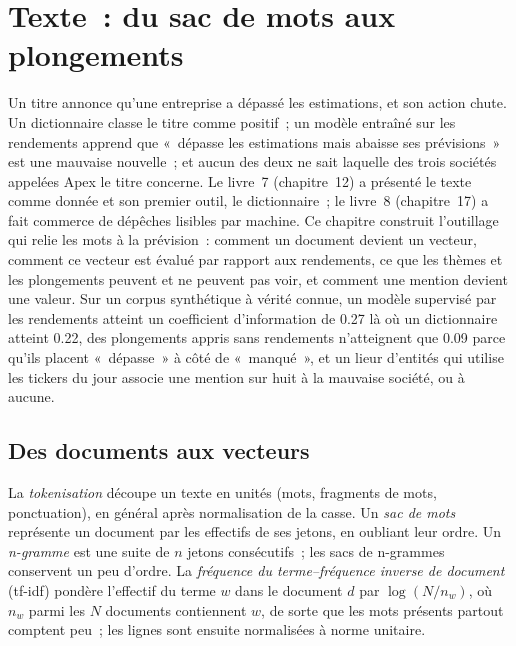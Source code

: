 \chapter{Texte~: du sac de mots aux plongements}\label{ch:ml:text-from-bag-of-words-to-embeddings}

Un titre annonce qu'une entreprise a dépassé les estimations, et son action chute. Un dictionnaire classe le titre comme positif~; un modèle
entraîné sur les rendements apprend que «~dépasse les estimations mais abaisse ses prévisions~» est une mauvaise nouvelle~; et aucun des deux ne sait laquelle des trois sociétés
appelées Apex le titre concerne. Le livre~7 (chapitre~12) a présenté le texte comme donnée et son premier outil, le dictionnaire~;
le livre~8 (chapitre~17) a fait commerce de dépêches lisibles par machine. Ce chapitre construit l'outillage qui relie les mots à la prévision~:
comment un document devient un vecteur, comment ce vecteur est évalué par rapport aux rendements, ce que les thèmes et les plongements peuvent et ne peuvent pas
voir, et comment une mention devient une valeur. Sur un corpus synthétique à vérité connue, un modèle supervisé par les rendements atteint
un coefficient d'information de 0.27 là où un dictionnaire atteint 0.22, des plongements appris sans rendements n'atteignent que 0.09 parce
qu'ils placent «~dépasse~» à côté de «~manqué~», et un lieur d'entités qui utilise les tickers du jour associe une mention sur huit à la
mauvaise société, ou à aucune.

\section{Des documents aux vecteurs}

\begin{definition}\label{def:ml:text-from-bag-of-words-to-embeddings:bow}
La \emph{tokenisation} découpe un texte en unités (mots, fragments de mots, ponctuation), en général après
normalisation de la casse. Un \emph{sac de mots} représente un document par les effectifs de ses jetons, en oubliant
leur ordre. Un \emph{n-gramme} est une suite de $n$ jetons consécutifs~; les sacs de n-grammes conservent un peu d'ordre.
La \emph{fréquence du terme--fréquence inverse de document} (tf-idf) pondère l'effectif
du terme $w$ dans le document $d$ par $\log(N/n_w)$, où $n_w$ parmi les $N$ documents contiennent $w$, de sorte que les mots
présents partout comptent peu~; les lignes sont ensuite normalisées à norme unitaire.
\end{definition}

